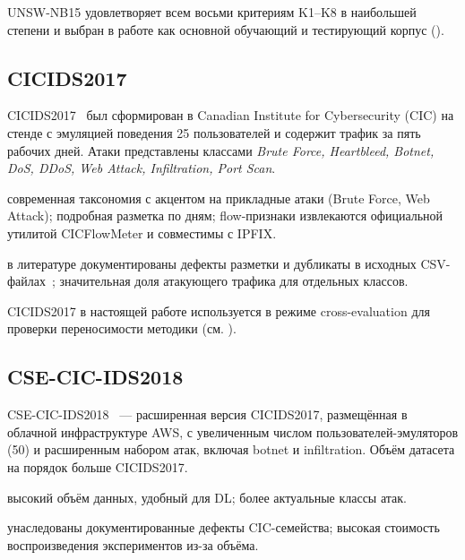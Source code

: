 UNSW-NB15 удовлетворяет всем восьми критериям K1--K8 в наибольшей степени и
выбран в работе как основной обучающий и тестирующий корпус
().

\subsection{CICIDS2017}

CICIDS2017~\cite{sharafaldin2018toward} был сформирован в Canadian Institute
for Cybersecurity (CIC) на стенде с эмуляцией поведения 25 пользователей и
содержит трафик за пять рабочих дней. Атаки представлены классами
\emph{Brute Force, Heartbleed, Botnet, DoS, DDoS, Web Attack, Infiltration,
Port Scan}.

\begin{description}[font=\normalfont\itshape, leftmargin=1.5em]
    \item[Сильные стороны:] современная таксономия с акцентом на прикладные
    атаки (Brute Force, Web Attack); подробная разметка по дням; flow-признаки
    извлекаются официальной утилитой CICFlowMeter и совместимы с IPFIX.
    \item[Ограничения:] в литературе документированы дефекты разметки и
    дубликаты в исходных
    CSV-файлах~\cite{gharib2016evalframework, ferrag2020dlcyber};
    значительная доля атакующего трафика для отдельных классов.
\end{description}

CICIDS2017 в настоящей работе используется в режиме cross-evaluation для
проверки переносимости методики (см. ).

\subsection{CSE-CIC-IDS2018}

CSE-CIC-IDS2018~\cite{sharafaldin2018toward} --- расширенная версия
CICIDS2017, размещённая в облачной инфраструктуре AWS, с увеличенным числом
пользователей-эмуляторов (50) и расширенным набором атак, включая botnet и
infiltration. Объём датасета на порядок больше CICIDS2017.

\begin{description}[font=\normalfont\itshape, leftmargin=1.5em]
    \item[Сильные стороны:] высокий объём данных, удобный для DL;
    более актуальные классы атак.
    \item[Ограничения:] унаследованы документированные дефекты CIC-семейства;
    высокая стоимость воспроизведения экспериментов из-за объёма.
\end{description}

